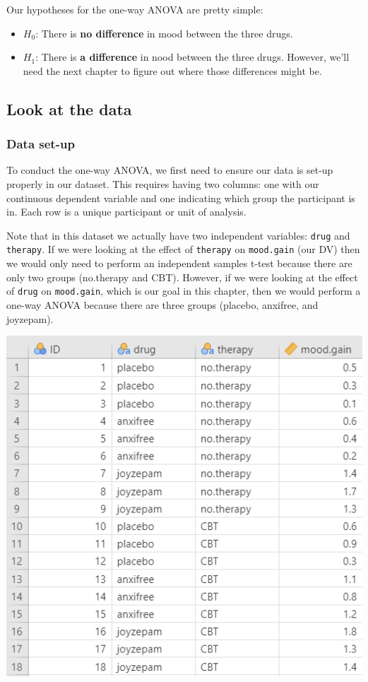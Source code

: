 \documentclass[
]{book}
\providecommand{\tightlist}{%
  \setlength{\itemsep}{0pt}\setlength{\parskip}{0pt}}
\begin{document}
Our hypotheses for the one-way ANOVA are pretty simple:

\begin{itemize}
\tightlist
\item
  \(H_0\): There is \textbf{no difference} in mood between the three drugs.
\item
  \(H_1\): There is \textbf{a difference} in nood between the three drugs. However, we'll need the next chapter to figure out where those differences might be.
\end{itemize}

\hypertarget{look-at-the-data-6}{%
\subsection{Look at the data}\label{look-at-the-data-6}}

\hypertarget{data-set-up-6}{%
\subsubsection{Data set-up}\label{data-set-up-6}}

To conduct the one-way ANOVA, we first need to ensure our data is set-up properly in our dataset. This requires having two columns: one with our continuous dependent variable and one indicating which group the participant is in. Each row is a unique participant or unit of analysis.

Note that in this dataset we actually have two independent variables: \texttt{drug} and \texttt{therapy}. If we were looking at the effect of \texttt{therapy} on \texttt{mood.gain} (our DV) then we would only need to perform an independent samples t-test because there are only two groups (no.therapy and CBT). However, if we were looking at the effect of \texttt{drug} on \texttt{mood.gain}, which is our goal in this chapter, then we would perform a one-way ANOVA because there are three groups (placebo, anxifree, and joyzepam).

\includegraphics{images/04_one-way-anova/anova_data.png}
\end{document}
